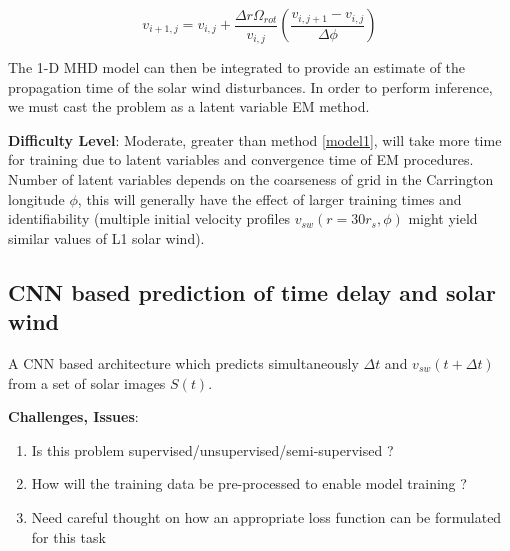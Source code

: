 \documentclass[]{book}
\theoremstyle{definition}
\begin{document}
\begin{equation}
    v_{i+1,j} = v_{i,j} + \frac{\Delta r \Omega_{rot}}{v_{i,j}} \left (\frac{v_{i,j+1} - v_{i,j}}{\Delta \phi} \right )
\end{equation}

The 1-D MHD model can then be integrated to provide an estimate of the propagation time of the solar wind disturbances. In order to perform inference, we must cast the problem as a latent variable EM method. 

\textbf{Difficulty Level}: Moderate, greater than method \ref{model1}, will take more time for training due to latent variables and convergence time of EM procedures. Number of latent variables depends on the coarseness of grid in the Carrington longitude $\phi$, this will generally have the effect of larger training times and identifiability (multiple initial velocity profiles $v_{sw}(r = 30r_s, \phi)$ might yield similar values of L1 solar wind).

\subsection{CNN based prediction of time delay and solar wind}

A CNN based architecture which predicts simultaneously $\Delta t$ and $v_{sw}(t + \Delta t)$ from a set of solar images $S(t)$.

\textbf{Challenges, Issues}: \begin{enumerate} \item Is this problem supervised/unsupervised/semi-supervised ? \item How will the training data be pre-processed to enable model training ? \item Need careful thought on how an appropriate loss function can be formulated for this task \end{enumerate}
\end{document}
